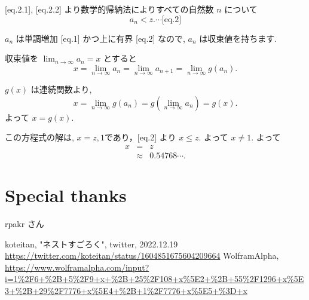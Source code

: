 \documentclass[a4j, 12pt]{jsarticle}
\renewcommand{\liminf}{\lim_{n\rightarrow\infty}}
\begin{document}
[eq.2.1], [eq.2.2] より数学的帰納法によりすべての自然数 $n$ について
\begin{equation*}
  a_n < z. \cdots \textrm{[eq.2]}
\end{equation*}

$a_n$ は単調増加 [eq.1] かつ上に有界 [eq.2] なので, $a_n$ は収束値を持ちます.

収束値を $\liminf a_n=x$ とすると
\begin{equation}
  x = \liminf a_n = \liminf a_{n+1} = \liminf g(a_n).
\end{equation}

$g(x)$ は連続関数より,
\begin{equation}
  x = \liminf g(a_n) =  g(\liminf a_n) = g(x).
\end{equation}
よって $x = g(x)$.

この方程式の解は, $x = z, 1$であり，[eq.2] より $x \leq z$. よって $x\neq 1$.  
よって
\begin{eqnarray}
  x&=&z\\
  &\approx& 0.54768\cdots.
\end{eqnarray}

\section*{Special thanks}
rpakr さん

\begin{thebibliography}{99}
 koteitan, "ネストすごろく", twitter, 2022.12.19 \url{https://twitter.com/koteitan/status/1604851675604209664}
 WolframAlpha, \url{https://www.wolframalpha.com/input?i=1%2F6+%2B+5%2F9+x+%2B+25%2F108+x%5E2+%2B+55%2F1296+x%5E3+%2B+29%2F7776+x%5E4+%2B+1%2F7776+x%5E5+%3D+x}
\end{thebibliography}
\end{document}
